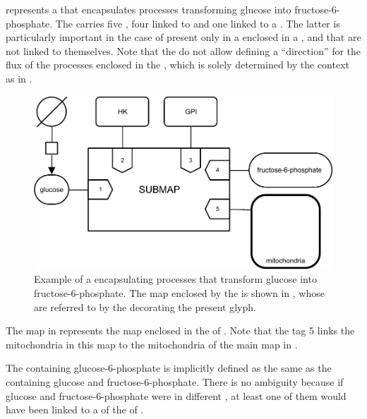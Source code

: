 represents a  that encapsulates processes transforming glucose into fructose-6-phosphate.
The  carries five , four linked to  and one linked to a .
The latter is particularly important in the case of  present only in a  enclosed in a , and that are not linked to  themselves.
Note that the  do not allow defining a ``direction'' for the flux of the processes enclosed in the , which is solely determined by the context as in .

\begin{figure}
\begin{center}
\includegraphics[scale=0.8]{images/build/submap_folded_example.pdf}
\caption{Example of a  encapsulating processes that transform glucose into fructose-6-phosphate.
The map enclosed by the  is shown in , whose  are referred to by the  decorating the present  glyph.
}
\label{fig:folded}
\end{center}
\end{figure}

The map in  represents the map enclosed in the  of .
Note that the tag 5 links the mitochondria  in this map to the mitochondria  of the main map in .

The  containing glucose-6-phosphate is implicitly defined as the same as the  containing glucose and fructose-6-phosphate.
There is no ambiguity because if glucose and fructose-6-phosphate were in different , at least one of them would have been linked to a  of the  of .

